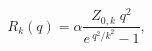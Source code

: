 \begin{equation}
R_k(q) = \alpha \frac{Z_{0,k}\;q^2}{e^{\:q^2/k^2}-1}
\mbox{,}
\label{cutoff}
\end{equation}

